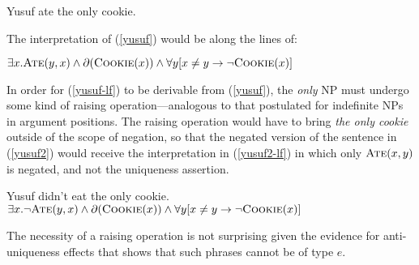 \begin{exe}
	\ex \label{yusuf} Yusuf ate the only cookie.
\end{exe}

The interpretation of (\ref{yusuf}) would be along the lines of:

\begin{exe}
	\ex \label{yusuf-lf} $\exists x . \textsc{Ate}(y, x) \land \partial(\textsc{Cookie}(x)) \land \forall y [ x \ne y \to \neg \textsc{Cookie}(x) ]$
\end{exe}

In order for (\ref{yusuf-lf}) to be derivable from (\ref{yusuf}), the \textit{only} NP must undergo some kind of raising operation---analogous to that postulated for indefinite NPs in argument positions. The raising operation would have to bring \textit{the only cookie} outside of the scope of negation, so that the negated version of the sentence in (\ref{yusuf2}) would receive the interpretation in (\ref{yusuf2-lf}) in which only $\textsc{Ate}(x, y)$ is negated, and not the uniqueness assertion.

\begin{exe}
	\ex \label{yusuf2} Yusuf didn't eat the only cookie.
	\ex \label{yusuf2-lf} $\exists x . \neg\textsc{Ate}(y, x) \land \partial(\textsc{Cookie}(x)) \land \forall y [ x \ne y \to \neg \textsc{Cookie}(x) ]$
\end{exe}

The necessity of a raising operation is not surprising given the evidence for anti-uniqueness effects that shows that such phrases cannot be of type $e$.

